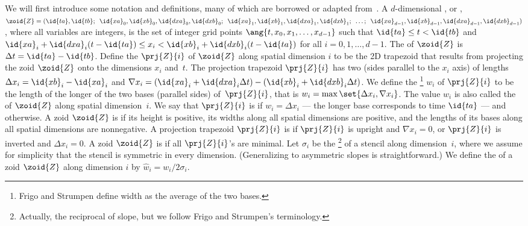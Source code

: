 We will first introduce some notation and definitions, many of which
are borrowed or adapted from~\cite{FrigoSt05,FrigoSt09}.  A
$d$-dimensional , or , $\zoid{Z} =
(\id{ta},\linebreak[0] \id{tb}\semi\linebreak[0]
\id{xa}_0,\linebreak[0] \id{xb}_0,\linebreak[0]
\id{dxa}_0,\linebreak[0] \id{dxb}_0\semi\linebreak[0]
\id{xa}_1,\linebreak[0] \id{xb}_1,\linebreak[0]
\id{dxa}_1,\linebreak[0] \id{dxb}_1\semi\linebreak[0]
\ldots\semi\linebreak[0] \id{xa}_{d-1},\linebreak[0]
\id{xb}_{d-1},\linebreak[0] \id{dxa}_{d-1},\linebreak[0]
\id{dxb}_{d-1})$, where all variables are integers, is the set of
integer grid points $\ang{t, x_0, x_1, \ldots, x_{d - 1}}$ such that
$\id{ta}\leq t < \id{tb}$ and $\id{xa}_i + \id{dxa}_{i}(t - \id{ta})
\leq x_i < \id{xb}_i + \id{dxb}_{i}(t - \id{ta})$ for all $i =
0,1,\ldots, d-1$.
%
The  of $\zoid{Z}$ is $\Delta t = \id{ta} - \id{tb}$.
Define the  $\prj{Z}{i}$ of $\zoid{Z}$ along
spatial dimension $i$ to be the 2D trapezoid that results from
projecting the zoid $\zoid{Z}$ onto the dimensions $x_i$ and~$t$.  The
projection trapezoid $\prj{Z}{i}$ has two  (sides parallel to
the $x_i$ axis) of lengths $\Delta x_i = \id{xb}_i-\id{xa}_i$ and
$\nabla x_i = (\id{xa}_i+\id{dxa}_i\Delta t) -
(\id{xb}_i+\id{dxb}_i\Delta t)$.  We define the
\footnote{Frigo and Strumpen \cite{FrigoSt05,FrigoSt09}
  define width as the average of the two bases.} $w_i$ of $\prj{Z}{i}$ to
be the length of the longer of the two bases (parallel sides)
of~$\prj{Z}{i}$, that is $w_i=\max\set{\Delta x_i, \nabla x_i}$.  The
value $w_i$ is also called the  of $\zoid{Z}$ along spatial
dimension~$i$.  We say that $\prj{Z}{i}$ is  if $w_i=\Delta
x_i$ --- the longer base corresponds to time $\id{ta}$ --- and
 otherwise.  A zoid $\zoid{Z}$ is  if
its height is positive, its widths along all spatial dimensions are
positive, and the lengths of its bases along all spatial dimensions
are nonnegative.  A projection trapezoid $\prj{Z}{i}$ is 
if $\prj{Z}{i}$ is upright and $\nabla x_i = 0$, or $\prj{Z}{i}$ is inverted
and $\Delta x_i = 0$.  A zoid $\zoid{Z}$ is  if all
$\prj{Z}{i}$'s are minimal.  Let $\sigma_i$ be the
\footnote{Actually, the reciprocal of slope, but we follow
  Frigo and Strumpen's terminology.} of a stencil along dimension~$i$, where we assume for simplicity
that the stencil is symmetric in every dimension.  (Generalizing to
asymmetric slopes is straightforward.)  We define the  of a zoid $\zoid{Z}$ along dimension $i$ by $\widehat{w}_i = w_i
/ 2 \sigma_i$.

